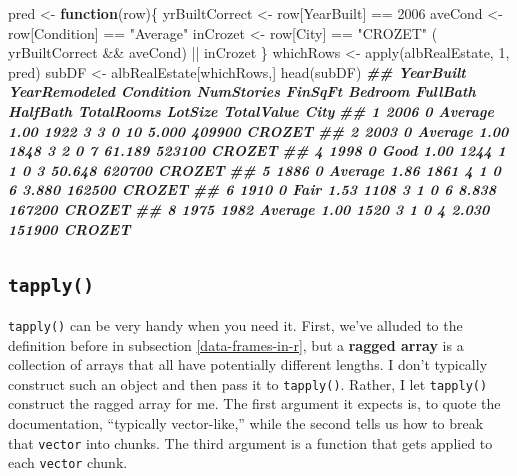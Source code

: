 \documentclass[
  12pt,
  krantz2]{krantz}
\makeatletter
\newenvironment{Shaded}{\begin{snugshade}}{\end{snugshade}}
\newcommand{\ControlFlowTok}[1]{\textcolor[rgb]{0.27,0.27,0.27}{\textbf{#1}}}
\newcommand{\DecValTok}[1]{\textcolor[rgb]{0.06,0.06,0.06}{#1}}
\newcommand{\DocumentationTok}[1]{\textcolor[rgb]{0.37,0.37,0.37}{\textbf{\textit{#1}}}}
\newcommand{\FunctionTok}[1]{\textcolor[rgb]{0,0,0}{#1}}
\newcommand{\NormalTok}[1]{#1}
\newcommand{\OtherTok}[1]{\textcolor[rgb]{0.37,0.37,0.37}{#1}}
\newcommand{\SpecialCharTok}[1]{\textcolor[rgb]{0,0,0}{#1}}
\newcommand{\StringTok}[1]{\textcolor[rgb]{0.5,0.5,0.5}{#1}}
\newenvironment{kframe}{%
\medskip{}
\setlength{\fboxsep}{.8em}
 \def\at@end@of@kframe{}%
 \ifinner\ifhmode%
  \def\at@end@of@kframe{\end{minipage}}%
  \begin{minipage}{\columnwidth}%
 \fi\fi%
 \def\FrameCommand##1{\hskip\@totalleftmargin \hskip-\fboxsep
 \colorbox{shadecolor}{##1}\hskip-\fboxsep
     \hskip-\linewidth \hskip-\@totalleftmargin \hskip\columnwidth}%
 \MakeFramed {\advance\hsize-\width
   \@totalleftmargin\z@ \linewidth\hsize
   \@setminipage}}%
 {\par\unskip\endMakeFramed%
 \at@end@of@kframe}
\renewenvironment{Shaded}{\begin{kframe}}{\end{kframe}}
\makeatother
\begin{document}
\begin{Shaded}
\begin{Highlighting}[]
\NormalTok{pred }\OtherTok{\textless{}{-}} \ControlFlowTok{function}\NormalTok{(row)\{}
\NormalTok{  yrBuiltCorrect }\OtherTok{\textless{}{-}}\NormalTok{ row[}\StringTok{\textquotesingle{}YearBuilt\textquotesingle{}}\NormalTok{] }\SpecialCharTok{==} \DecValTok{2006}
\NormalTok{  aveCond }\OtherTok{\textless{}{-}}\NormalTok{ row[}\StringTok{\textquotesingle{}Condition\textquotesingle{}}\NormalTok{] }\SpecialCharTok{==} \StringTok{"Average"}
\NormalTok{  inCrozet }\OtherTok{\textless{}{-}}\NormalTok{ row[}\StringTok{\textquotesingle{}City\textquotesingle{}}\NormalTok{] }\SpecialCharTok{==} \StringTok{"CROZET"}
\NormalTok{  ( yrBuiltCorrect }\SpecialCharTok{\&\&}\NormalTok{ aveCond) }\SpecialCharTok{||}\NormalTok{ inCrozet }
\NormalTok{\}}
\NormalTok{whichRows }\OtherTok{\textless{}{-}} \FunctionTok{apply}\NormalTok{(albRealEstate, }\DecValTok{1}\NormalTok{, pred)}
\NormalTok{subDF }\OtherTok{\textless{}{-}}\NormalTok{ albRealEstate[whichRows,]}
\FunctionTok{head}\NormalTok{(subDF)}
\DocumentationTok{\#\#   YearBuilt YearRemodeled Condition NumStories FinSqFt Bedroom FullBath HalfBath TotalRooms LotSize TotalValue   City}
\DocumentationTok{\#\# 1      2006             0   Average       1.00    1922       3        3        0         10   5.000     409900 CROZET}
\DocumentationTok{\#\# 2      2003             0   Average       1.00    1848       3        2        0          7  61.189     523100 CROZET}
\DocumentationTok{\#\# 4      1998             0      Good       1.00    1244       1        1        0          3  50.648     620700 CROZET}
\DocumentationTok{\#\# 5      1886             0   Average       1.86    1861       4        1        0          6   3.880     162500 CROZET}
\DocumentationTok{\#\# 6      1910             0      Fair       1.53    1108       3        1        0          6   8.838     167200 CROZET}
\DocumentationTok{\#\# 8      1975          1982   Average       1.00    1520       3        1        0          4   2.030     151900 CROZET}
\end{Highlighting}
\end{Shaded}

\hypertarget{tapply}{%
\subsection{\texorpdfstring{\texttt{tapply()}}{tapply()}}\label{tapply}}

\texttt{tapply()} can be very handy when you need it. First, we've alluded to the definition before in subsection \ref{data-frames-in-r}, but a \textbf{ragged array} is a collection of arrays that all have potentially different lengths. I don't typically construct such an object and then pass it to \texttt{tapply()}. Rather, I let \texttt{tapply()} construct the ragged array for me. The first argument it expects is, to quote the documentation, ``typically vector-like,'' while the second tells us how to break that \texttt{vector} into chunks. The third argument is a function that gets applied to each \texttt{vector} chunk.
\end{document}

